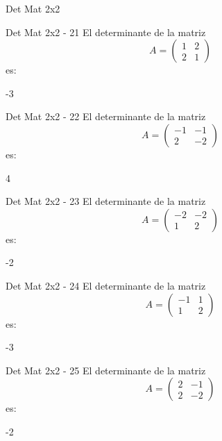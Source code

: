 \documentclass[a4,11pt]{aleph-notas}
\begin{document}
\begin{quiz}{Det Mat 2x2}
\begin{numerical}[tolerance=0]%
    {Det Mat 2x2 - 21}
    El determinante de la matriz
    \[
        A = \begin{pmatrix} 1 & 2 \\ 2 & 1 \end{pmatrix}
    \]
    es:
    \item[] -3
\end{numerical}

\begin{numerical}[tolerance=0]%
    {Det Mat 2x2 - 22}
    El determinante de la matriz
    \[
        A = \begin{pmatrix} -1 & -1 \\ 2 & -2 \end{pmatrix}
    \]
    es:
    \item[] 4
\end{numerical}

\begin{numerical}[tolerance=0]%
    {Det Mat 2x2 - 23}
    El determinante de la matriz
    \[
        A = \begin{pmatrix} -2 & -2 \\ 1 & 2 \end{pmatrix}
    \]
    es:
    \item[] -2
\end{numerical}

\begin{numerical}[tolerance=0]%
    {Det Mat 2x2 - 24}
    El determinante de la matriz
    \[
        A = \begin{pmatrix} -1 & 1 \\ 1 & 2 \end{pmatrix}
    \]
    es:
    \item[] -3
\end{numerical}

\begin{numerical}[tolerance=0]%
    {Det Mat 2x2 - 25}
    El determinante de la matriz
    \[
        A = \begin{pmatrix} 2 & -1 \\ 2 & -2 \end{pmatrix}
    \]
    es:
    \item[] -2
\end{numerical}


\end{quiz}
\end{document}
